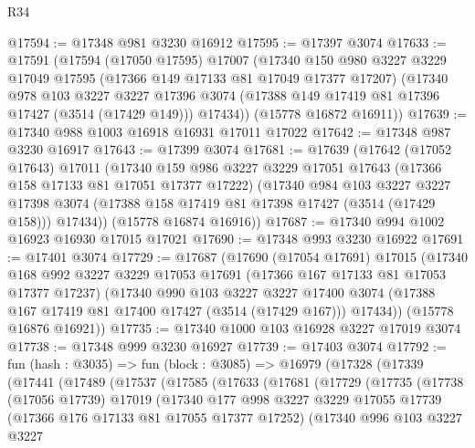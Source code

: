 \begin{lexlean}{R34}
\begin{coremodule}
@17594 := @17348 @981 @3230 @16912
@17595 := @17397 @3074
@17633 := @17591
    (@17594
      (@17050 @17595)
      @17007
      (@17340
        @150
        @980
        @3227
        @3229
        @17049
        @17595
        (@17366 @149 @17133 @81 @17049 @17377 @17207)
        (@17340
          @978
          @103
          @3227
          @3227
          @17396
          @3074
          (@17388 @149 @17419 @81 @17396 @17427 (@3514 (@17429 @149)))
          @17434))
      (@15778 @16872 @16911))
@17639 := @17340 @988 @1003 @16918 @16931 @17011 @17022
@17642 := @17348 @987 @3230 @16917
@17643 := @17399 @3074
@17681 := @17639
    (@17642
      (@17052 @17643)
      @17011
      (@17340
        @159
        @986
        @3227
        @3229
        @17051
        @17643
        (@17366 @158 @17133 @81 @17051 @17377 @17222)
        (@17340
          @984
          @103
          @3227
          @3227
          @17398
          @3074
          (@17388 @158 @17419 @81 @17398 @17427 (@3514 (@17429 @158)))
          @17434))
      (@15778 @16874 @16916))
@17687 := @17340 @994 @1002 @16923 @16930 @17015 @17021
@17690 := @17348 @993 @3230 @16922
@17691 := @17401 @3074
@17729 := @17687
    (@17690
      (@17054 @17691)
      @17015
      (@17340
        @168
        @992
        @3227
        @3229
        @17053
        @17691
        (@17366 @167 @17133 @81 @17053 @17377 @17237)
        (@17340
          @990
          @103
          @3227
          @3227
          @17400
          @3074
          (@17388 @167 @17419 @81 @17400 @17427 (@3514 (@17429 @167)))
          @17434))
      (@15778 @16876 @16921))
@17735 := @17340 @1000 @103 @16928 @3227 @17019 @3074
@17738 := @17348 @999 @3230 @16927
@17739 := @17403 @3074
@17792 := fun (hash : @3035) =>
  fun (block : @3085) =>
  @16979
    (@17328
      (@17339
        (@17441
          (@17489
            (@17537
              (@17585
                (@17633
                  (@17681
                    (@17729
                      (@17735
                        (@17738
                          (@17056 @17739)
                          @17019
                          (@17340
                            @177
                            @998
                            @3227
                            @3229
                            @17055
                            @17739
                            (@17366 @176 @17133 @81 @17055 @17377 @17252)
                            (@17340
                              @996
                              @103
                              @3227
                              @3227

\end{coremodule}
\end{lexlean}
